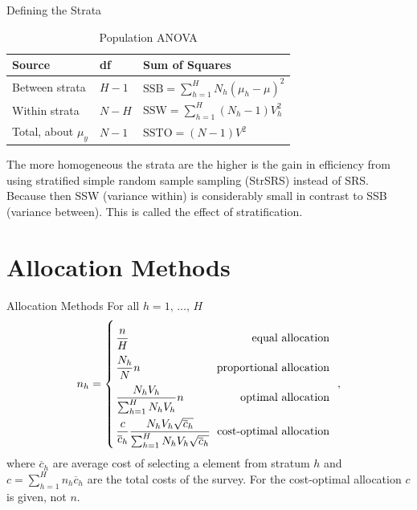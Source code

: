 \documentclass[10pt]{beamer}\usepackage[]{graphicx}\usepackage[]{color}
\newcommand{\V}[1]{\text{V}\left(#1\right)}
\begin{document}
\begin{frame}{Defining the Strata}
  \begin{table}\caption{Population ANOVA}
  \begin{tabular}{l | l | l }
  Source & df & Sum of Squares  \\
  \hline 
   Between strata         & $H-1$ & $\text{SSB}  = \sum_{h=1}^H N_h ( \mu_{h} - \mu  )^2$  \\ 
   Within  strata         & $N-H$ & $\text{SSW}  = \sum_{h=1}^H (N_h-1) V_{h}^2$  \\
   Total,  about  $\mu_y$ & $N-1$ & $\text{SSTO} = (N-1) V^2$ \\
  \end{tabular}
  \end{table}

The more homogeneous the strata are the higher is the gain in efficiency from using stratified simple random sample sampling (StrSRS) instead of SRS. Because then SSW (variance within) is
considerably small in contrast to SSB (variance between). This is called
the  effect of stratification. 

\end{frame}

\section{Allocation Methods}

\begin{frame}{Allocation Methods}
For all $h = 1{,}\,\ldots{,}\,H$
 \begin{equation*} \arraycolsep=1.4pt\def\arraystretch{2.2}
  n_h = \left\{ \begin{array}{l r}
        \dfrac{n}{H}  &\; \text{equal allocation} \\
        \dfrac{N_h}{N}  n    &\; \text{proportional allocation} \\
        \dfrac{N_h V_{h}}{\sum_{h=1}^H N_h V_{h} }  n  &\; \text{optimal allocation} \\
        \dfrac{c}{\overline{c}_h} \dfrac{N_h V_{h} \sqrt{\overline{c}_h} }{\sum_{h=1}^H N_h V_{h} \sqrt{\overline{c}_h}}    &\;  \text{cost-optimal allocation}
  \end{array}\;\right.{,}
 \end{equation*}
 where $\overline{c}_h$ are average cost of selecting a element from stratum $h$ and $c=\sum_{h=1}^H n_h \overline{c}_h$ are the total costs of the survey. For the cost-optimal allocation $c$ is given, not $n$.
% 
\end{frame}
\end{document}
